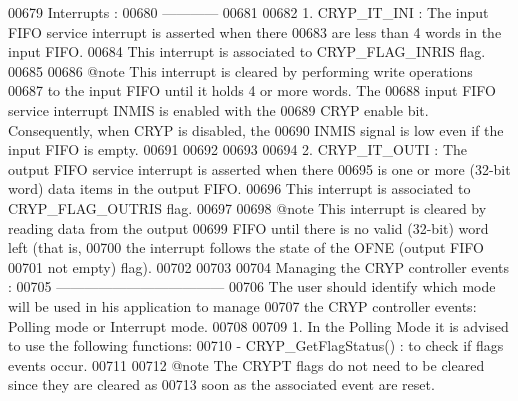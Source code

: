 \begin{DoxyCode}
00679 \textcolor{comment}{  Interrupts :}
00680 \textcolor{comment}{  ------------}
00681 \textcolor{comment}{}
00682 \textcolor{comment}{   1. CRYP\_IT\_INI   : The input FIFO service interrupt is asserted when there }
00683 \textcolor{comment}{                      are less than 4 words in the input FIFO.}
00684 \textcolor{comment}{                      This interrupt is associated to CRYP\_FLAG\_INRIS flag.}
00685 \textcolor{comment}{}
00686 \textcolor{comment}{                @note This interrupt is cleared by performing write operations }
00687 \textcolor{comment}{                      to the input FIFO until it holds 4 or more words. The }
00688 \textcolor{comment}{                      input FIFO service interrupt INMIS is enabled with the }
00689 \textcolor{comment}{                      CRYP enable bit. Consequently, when CRYP is disabled, the }
00690 \textcolor{comment}{                      INMIS signal is low even if the input FIFO is empty.}
00691 \textcolor{comment}{}
00692 \textcolor{comment}{}
00693 \textcolor{comment}{}
00694 \textcolor{comment}{   2. CRYP\_IT\_OUTI  : The output FIFO service interrupt is asserted when there }
00695 \textcolor{comment}{                      is one or more (32-bit word) data items in the output FIFO.}
00696 \textcolor{comment}{                      This interrupt is associated to CRYP\_FLAG\_OUTRIS flag.}
00697 \textcolor{comment}{}
00698 \textcolor{comment}{                @note This interrupt is cleared by reading data from the output }
00699 \textcolor{comment}{                      FIFO until there is no valid (32-bit) word left (that is, }
00700 \textcolor{comment}{                      the interrupt follows the state of the OFNE (output FIFO }
00701 \textcolor{comment}{                      not empty) flag).}
00702 \textcolor{comment}{}
00703 \textcolor{comment}{}
00704 \textcolor{comment}{  Managing the CRYP controller events :}
00705 \textcolor{comment}{  ------------------------------------ }
00706 \textcolor{comment}{  The user should identify which mode will be used in his application to manage }
00707 \textcolor{comment}{  the CRYP controller events: Polling mode or Interrupt mode.}
00708 \textcolor{comment}{}
00709 \textcolor{comment}{  1.  In the Polling Mode it is advised to use the following functions:}
00710 \textcolor{comment}{      - CRYP\_GetFlagStatus() : to check if flags events occur. }
00711 \textcolor{comment}{}
00712 \textcolor{comment}{  @note  The CRYPT flags do not need to be cleared since they are cleared as }
00713 \textcolor{comment}{         soon as the associated event are reset.   }

\end{DoxyCode}
